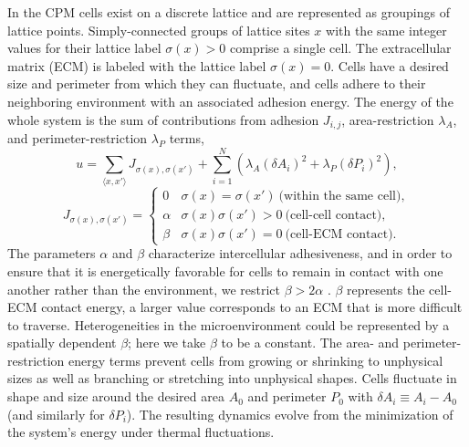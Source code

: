 In the CPM cells exist on a discrete lattice and are represented as groupings of lattice points. Simply-connected groups of lattice sites $x$ with the same integer values for their lattice label $\sigma(x)>0$ comprise a single cell. The extracellular matrix (ECM) is labeled with the lattice label $\sigma(x)=0$. Cells have a desired size and perimeter from which they can fluctuate, and cells adhere to their neighboring environment with an associated adhesion energy. The energy of the whole system is the sum of contributions from adhesion $J_{i,j}$, area-restriction $\lambda_A$, and perimeter-restriction $\lambda_P$ terms,
\begin{equation}
    u = \sum_{\langle x,x' \rangle} J_{\sigma(x),\sigma(x')} + \sum_{i=1}^N \left( \lambda_A (\delta A_i)^2 + \lambda_P (\delta P_i)^2 \right),
\end{equation}
\begin{equation}
    J_{\sigma(x),\sigma(x')} =
    \begin{cases}
        0 &\sigma(x)=\sigma(x') \ \text{(within the same cell)}, \\
        \alpha &\sigma(x)\sigma(x')>0 \ \text{(cell-cell contact)}, \\
        \beta &\sigma(x)\sigma(x')=0 \ \text{(cell-ECM contact)}.
    \end{cases}
\end{equation}
The parameters $\alpha$ and $\beta$ characterize intercellular adhesiveness, and in order to ensure that it is energetically favorable for cells to remain in contact with one another rather than the environment, we restrict $\beta > 2\alpha$ \cite{szabo2010collective}. $\beta$ represents the cell-ECM contact energy, a larger value corresponds to an ECM that is more difficult to traverse. Heterogeneities in the microenvironment could be represented by a spatially dependent $\beta$; here we take $\beta$ to be a constant. The area- and perimeter-restriction energy terms prevent cells from growing or shrinking to unphysical sizes as well as branching or stretching into unphysical shapes. Cells fluctuate in shape and size around the desired area $A_0$ and perimeter $P_0$ with $\delta A_i \equiv A_i-A_0$ (and similarly for $\delta P_i$). The resulting dynamics evolve from the minimization of the system's energy under thermal fluctuations.

